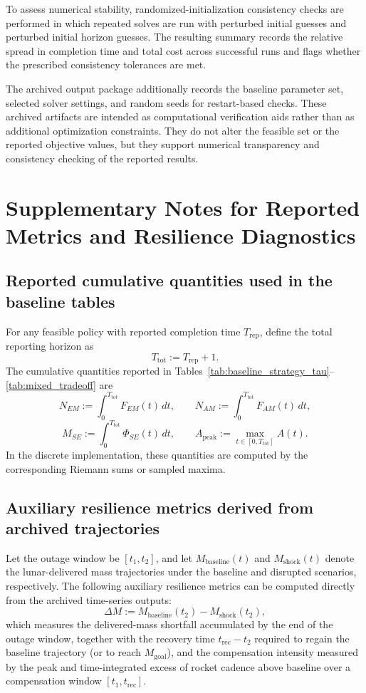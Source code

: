 \documentclass[12pt]{article}
\begin{document}
To assess numerical stability, randomized-initialization consistency checks are performed in which repeated solves are run with perturbed initial guesses and perturbed initial horizon guesses. The resulting summary records the relative spread in completion time and total cost across successful runs and flags whether the prescribed consistency tolerances are met.

The archived output package additionally records the baseline parameter set, selected solver settings, and random seeds for restart-based checks. These archived artifacts are intended as computational verification aids rather than as additional optimization constraints. They do not alter the feasible set or the reported objective values, but they support numerical transparency and consistency checking of the reported results.

\section{Supplementary Notes for Reported Metrics and Resilience Diagnostics}
\label{app:results_notes}

\subsection{Reported cumulative quantities used in the baseline tables}
\label{app:reported_metrics}

For any feasible policy with reported completion time $T_{\mathrm{rep}}$, define the total reporting horizon as
\[
T_{\mathrm{tot}}:=T_{\mathrm{rep}}+1 .
\]
The cumulative quantities reported in Tables~\ref{tab:baseline_strategy_tau}--\ref{tab:mixed_tradeoff} are
\[
N_{EM}:=\int_{0}^{T_{\mathrm{tot}}}F_{EM}(t)\,dt,\qquad
N_{AM}:=\int_{0}^{T_{\mathrm{tot}}}F_{AM}(t)\,dt,
\]
\[
M_{SE}:=\int_{0}^{T_{\mathrm{tot}}}\Phi_{SE}(t)\,dt,\qquad
A_{\mathrm{peak}}:=\max_{t\in[0,T_{\mathrm{tot}}]}A(t).
\]
In the discrete implementation, these quantities are computed by the corresponding Riemann sums or sampled maxima.

\subsection{Auxiliary resilience metrics derived from archived trajectories}
\label{app:resilience_metrics}

Let the outage window be $[t_1,t_2]$, and let $M_{\mathrm{baseline}}(t)$ and $M_{\mathrm{shock}}(t)$ denote the lunar-delivered mass trajectories under the baseline and disrupted scenarios, respectively. The following auxiliary resilience metrics can be computed directly from the archived time-series outputs:
\[
\Delta M:=M_{\mathrm{baseline}}(t_2)-M_{\mathrm{shock}}(t_2),
\]
which measures the delivered-mass shortfall accumulated by the end of the outage window, together with the recovery time $t_{\mathrm{rec}}-t_2$ required to regain the baseline trajectory (or to reach $M_{\mathrm{goal}}$), and the compensation intensity measured by the peak and time-integrated excess of rocket cadence above baseline over a compensation window $[t_1,t_{\mathrm{rec}}]$.
\end{document}
